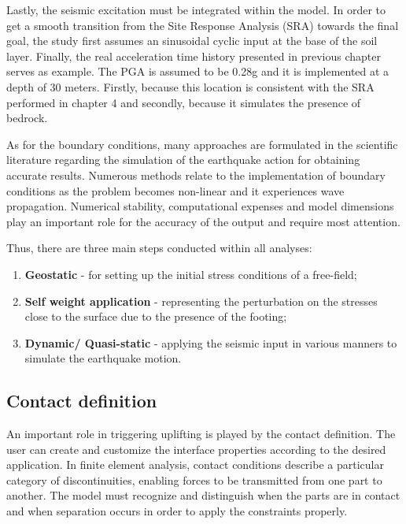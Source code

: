 Lastly, the seismic excitation must be integrated within the model. In order to get a smooth transition from the Site Response Analysis (SRA) towards the final goal, the study first assumes an sinusoidal cyclic input at the base of the soil layer. Finally, the real acceleration time history presented in previous chapter serves as example. The PGA is assumed to be 0.28g and it is implemented at a depth of 30 meters. Firstly, because this location is consistent with the SRA performed in chapter 4 and secondly, because it simulates the presence of bedrock.

As for the boundary conditions, many approaches are formulated in the scientific literature regarding the simulation of the earthquake \mbox{action} for obtaining accurate results. Numerous methods relate to the implementation of boundary conditions as the problem becomes non-linear and it experiences wave propagation. Numerical stability, computational expenses and model dimensions play an important role for the accuracy of the output and require most attention.  %

Thus, there are three main steps conducted within all analyses:
\begin{enumerate}
	\item \textbf{Geostatic} - for setting up the initial stress conditions of a free-field;
	\item \textbf{Self weight application} - representing the perturbation on the stresses close to the surface due to the presence of the footing;
	\item \textbf{Dynamic/ Quasi-static} - applying the seismic input in various manners to simulate the earthquake motion.
\end{enumerate}

\subsection{Contact definition}
An important role in triggering uplifting is played by the contact definition. The user can create and customize the interface properties according to the desired application. In finite element analysis, contact conditions describe a particular category of discontinuities, enabling forces to be transmitted from one part to another. The model must recognize and distinguish when the parts are in contact and when separation occurs in order to apply the constraints properly. 

